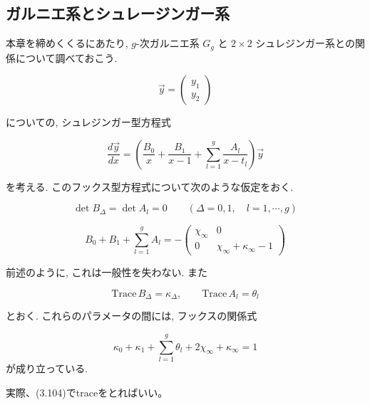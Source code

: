 \documentclass[paper=a4, fontsize=11pt]{jlreq} %
\newenvironment{story}{%
  \begin{mdframed}[
    backgroundcolor=red!5, %
    linewidth=0pt,         %
    innertopmargin=10pt,   %
    innerbottommargin=10pt,
    innerrightmargin=10pt, %
    innerleftmargin=10pt
  ]%
}{%
  \end{mdframed}%
}
\theoremstyle{break}
\theoremstyle{qa}
\begin{document}
\subsection{ガルニエ系とシュレージンガー系}
\begin{story}
本章を締めくくるにあたり, $g$-次ガルニエ系 $G_g$ と $2 \times 2$ シュレジンガー系との関係について調べておこう.

\[
\vec{y} = \begin{pmatrix} y_1 \\ y_2 \end{pmatrix}
\]

についての, シュレジンガー型方程式

\begin{equation} \tag{3.103}
    \frac{d\vec{y}}{dx} = \left( \frac{B_0}{x} + \frac{B_1}{x-1} + \sum_{l=1}^g \frac{A_l}{x-t_l} \right) \vec{y}
\end{equation}

を考える. このフックス型方程式について次のような仮定をおく.

\[
\det B_\Delta = \det A_l = 0 \qquad (\Delta = 0, 1, \quad l = 1, \cdots, g)
\]

\begin{equation} \tag{3.104}
    B_0 + B_1 + \sum_{l=1}^g A_l = - \begin{pmatrix} \chi_\infty & 0 \\ 0 & \chi_\infty + \kappa_\infty - 1 \end{pmatrix}
\end{equation}

前述のように, これは一般性を失わない. また

\[
\mathrm{Trace}\, B_\Delta = \kappa_\Delta, \qquad \mathrm{Trace}\, A_l = \theta_l
\]

とおく. これらのパラメータの間には, フックスの関係式

\[
\kappa_0 + \kappa_1 + \sum_{l=1}^g \theta_l + 2\chi_\infty + \kappa_\infty = 1
\]
が成り立っている.
\end{story}
実際、(3.104)でtraceをとればいい。
\end{document}
